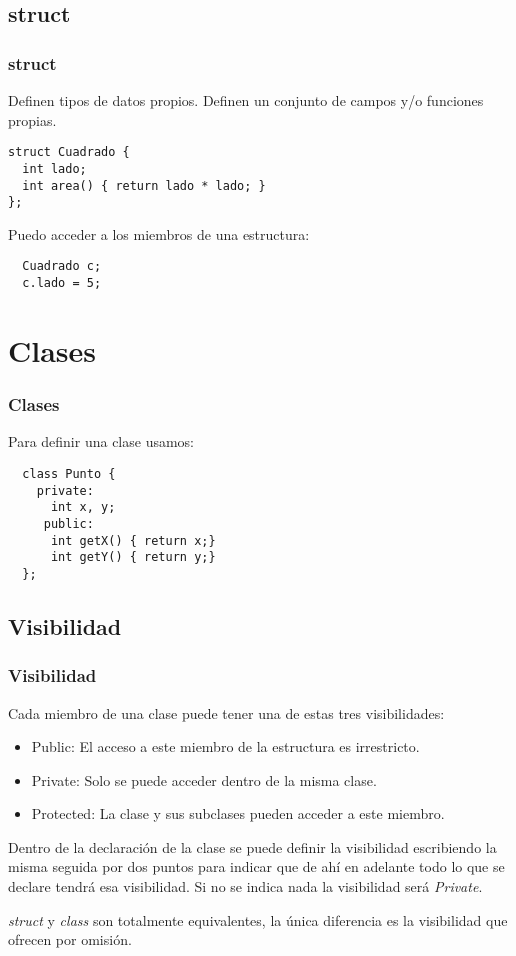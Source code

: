 \documentclass{beamer}
\begin{document}
\subsection{struct}
\begin{frame}[fragile]
\frametitle{struct}
Definen tipos de datos propios. Definen un conjunto de campos y/o funciones propias.

\begin{verbatim}
struct Cuadrado {
  int lado;
  int area() { return lado * lado; }
};
\end{verbatim}

Puedo acceder a los miembros de una estructura:
\begin{verbatim}
  Cuadrado c;
  c.lado = 5;
\end{verbatim}

\end{frame}


\section{Clases}
\begin{frame}[fragile]
\frametitle{Clases}

Para definir una clase usamos:
\begin{verbatim}
  class Punto {
    private:
      int x, y;
     public:
      int getX() { return x;}
      int getY() { return y;}
  };
\end{verbatim}

\end{frame}

\subsection{Visibilidad}
\begin{frame}
\frametitle{Visibilidad}
Cada miembro de una clase puede tener una de estas tres visibilidades:
\begin{itemize}
 \item Public: El acceso a este miembro de la estructura es irrestricto.
 \item Private: Solo se puede acceder dentro de la misma clase.
 \item Protected: La clase y sus subclases pueden acceder a este miembro.
\end{itemize}

Dentro de la declaración de la clase se puede definir la visibilidad escribiendo
 la misma seguida por dos puntos para indicar que de ahí en adelante todo lo que se declare tendrá esa visibilidad.
Si no se indica nada la visibilidad será \emph{Private}.
\begin{block}{}
 \emph{struct} y \emph{class} son totalmente equivalentes, la única diferencia es la visibilidad que ofrecen por omisión.
\end{block}

\end{frame}
\end{document}
